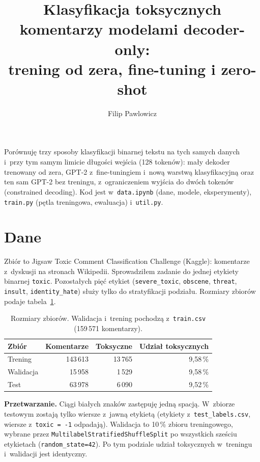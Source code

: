 \documentclass[10pt,a4paper]{article}
\title{Klasyfikacja toksycznych komentarzy modelami decoder-only:\\
trening od zera, fine-tuning i zero-shot}
\author{Filip Pawlowicz}
\date{}
\begin{document}
\maketitle

Porównuję trzy sposoby klasyfikacji binarnej tekstu na tych samych danych i~przy tym samym limicie długości wejścia (128 tokenów): mały dekoder trenowany od zera, GPT-2 z~fine-tuningiem i~nową warstwą klasyfikacyjną oraz ten sam GPT-2 bez treningu, z~ograniczeniem wyjścia do dwóch tokenów (constrained decoding). Kod jest w~\texttt{data.ipynb} (dane, modele, eksperymenty), \texttt{train.py} (pętla treningowa, ewaluacja) i~\texttt{util.py}.

\section{Dane}

Zbiór to Jigsaw Toxic Comment Classification Challenge (Kaggle): komentarze z~dyskusji na stronach Wikipedii. Sprowadziłem zadanie do jednej etykiety binarnej \texttt{toxic}. Pozostałych pięć etykiet (\texttt{severe\_toxic}, \texttt{obscene}, \texttt{threat}, \texttt{insult}, \texttt{identity\_hate}) służy tylko do stratyfikacji podziału. Rozmiary zbiorów podaje tabela~\ref{tab:sizes}.

\begin{table}[htbp]
\centering
\begin{tabular}{lrrr}
\toprule
Zbiór & Komentarze & Toksyczne & Udział toksycznych \\
\midrule
Trening    & 143\,613 & 13\,765 & 9,58\,\% \\
Walidacja  & 15\,958  & 1\,529  & 9,58\,\% \\
Test       & 63\,978  & 6\,090  & 9,52\,\% \\
\bottomrule
\end{tabular}
\caption{Rozmiary zbiorów. Walidacja i~trening pochodzą z~\texttt{train.csv} (159\,571 komentarzy).}
\label{tab:sizes}
\end{table}

\textbf{Przetwarzanie.} Ciągi białych znaków zastępuję jedną spacją. W~zbiorze testowym zostają tylko wiersze z~jawną etykietą (etykiety z~\texttt{test\_labels.csv}, wiersze z~\texttt{toxic = -1} odpadają). Walidacja to 10\,\% zbioru treningowego, wybrane przez \texttt{MultilabelStratifiedShuffleSplit} po wszystkich sześciu etykietach (\texttt{random\_state=42}). Po tym podziale udział toksycznych w~treningu i~walidacji jest identyczny.
\end{document}
